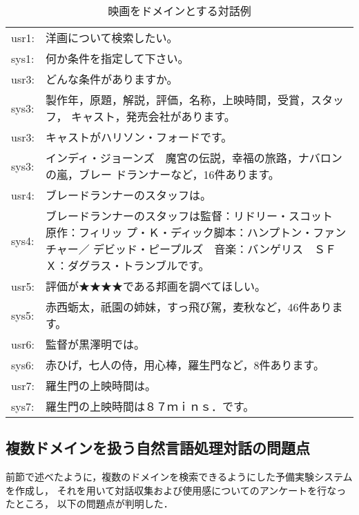 \begin{table}[thp]
\caption{映画をドメインとする対話例}\label{tab:cinema}
\bigskip \centering \tt

\begin{tabular}{lp{120mm}} \hline\hline
usr1:&洋画について検索したい。\rule{0pt}{12pt}\\
sys1:&何か条件を指定して下さい。\\
usr3:&どんな条件がありますか。\\
sys3:&製作年，原題，解説，評価，名称，上映時間，受賞，スタッフ，
キャスト，発売会社があります。\\
usr3:&キャストがハリソン・フォードです。\\
sys3:&インディ・ジョーンズ　魔宮の伝説，幸福の旅路，ナバロンの嵐，ブレー
ドランナーなど，16件あります。\\
usr4:&ブレードランナーのスタッフは。\\
sys4:&ブレードランナーのスタッフは監督：リドリー・スコット　原作：フィリッ
プ・Ｋ・ディック脚本：ハンプトン・ファンチャー／
デビッド・ピープルズ　音楽：バンゲリス　ＳＦＸ：ダグラス・トランブルです。\\
usr5:&評価が★★★★である邦画を調べてほしい。\\
sys5:&赤西蛎太，祇園の姉妹，すっ飛び駕，麦秋など，46件あります。\\
usr6:&監督が黒澤明では。\\
sys6:&赤ひげ，七人の侍，用心棒，羅生門など，8件あります。\\
usr7:&羅生門の上映時間は。\\
sys7:&羅生門の上映時間は８７ｍｉｎｓ．です。
\\ \hline\hline
\end{tabular}
\end{table}

\subsection{複数ドメインを扱う自然言語処理対話の問題点}\label{ssec:issue}
前節で述べたように，複数のドメインを検索できるようにした予備実験システムを作成し，
それを用いて対話収集および使用感についてのアンケートを行なったところ，
以下の問題点が判明した．


